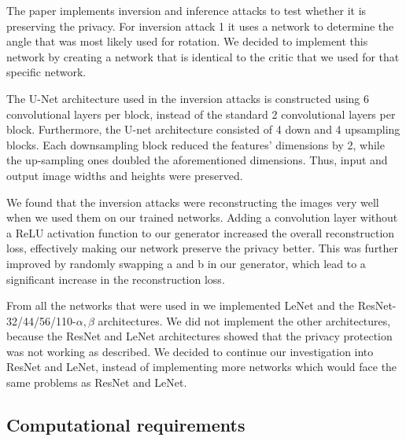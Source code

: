 The paper implements inversion and inference attacks to test whether it is preserving the privacy. For inversion attack 1 it uses a network to determine the angle that was most likely used for rotation. We decided to implement this network by creating a network that is identical to the critic that we used for that specific network.

The U-Net architecture used in the inversion attacks is constructed using 6 convolutional layers per block, instead of the standard 2 convolutional layers per block. Furthermore, the U-net architecture consisted of 4 down and 4 upsampling blocks. Each downsampling block reduced the features' dimensions by 2, while the up-sampling ones doubled the aforementioned dimensions. Thus, input and output image widths and heights were preserved.

We found that the inversion attacks were reconstructing the images very well when we used them on our trained networks. Adding a convolution layer without a ReLU activation function to our generator increased the overall reconstruction loss, effectively making our network preserve the privacy better. This was further improved by randomly swapping a and b in our generator, which lead to a significant increase in the reconstruction loss.

From all the networks that were used in \citet{xiang2020interpretable} we implemented LeNet and the ResNet-32/44/56/110-$\alpha, \beta$ architectures. We did not implement the other architectures, because the ResNet and LeNet architectures showed that the privacy protection was not working as described. We decided to continue our investigation into ResNet and LeNet, instead of implementing more networks which would face the same problems as ResNet and LeNet.


\subsection{Computational requirements}

